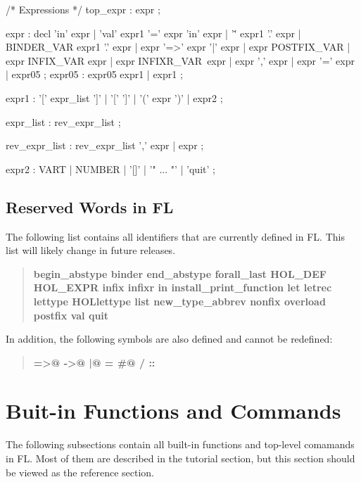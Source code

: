 \begin{hol}
/* Expressions */
top_expr        : expr ;

expr            : decl 'in' expr
                | 'val' expr1 '=' expr 'in' expr
                | '\.' expr1 '.' expr
                | BINDER_VAR expr1 '.' expr
                | expr '=>' expr '|' expr
                | expr POSTFIX_VAR
                | expr INFIX_VAR expr
                | expr INFIXR_VAR\ expr
                | expr ',' expr
                | expr '=' expr
                | expr05
                ;
expr05          : expr05 expr1
                | expr1
                ;

expr1           : '[' expr_list ']'
                | '[' ']'
                | '(' expr ')'
                | expr2
                ;

expr_list       : rev_expr_list
                ;

rev_expr_list   : rev_expr_list ',' expr
                | expr
                ;

expr2           : VART
                | NUMBER
                | '[]'
                | '" ... "'
                | 'quit'
                ;
\end{hol}

\subsection{Reserved Words in FL}

The following list contains all identifiers that are currently defined
in FL. This list will likely change in future releases.
\begin{quote}
{\bf
begin\_abstype
binder
end\_abstype
forall\_last
HOL\_DEF
HOL\_EXPR
infix
infixr
in
install\_print\_function
let
letrec
lettype
HOLlettype
list
new\_type\_abbrev
nonfix
overload
postfix
val
quit}
\end{quote}
In addition, the following symbols are also defined and cannot be
redefined:
\begin{quote}
{\bf
\verb@=>@
\verb@->@
\verb@|@
=
\verb@#@
\verb@/\@
\verb@\@
::
}
\end{quote}

\newpage
\section{Buit-in Functions and Commands}

The following subsections contain all built-in functions and
top-level comamands in FL.
Most of them are described in the tutorial section, but this section
should be viewed as the reference section.

